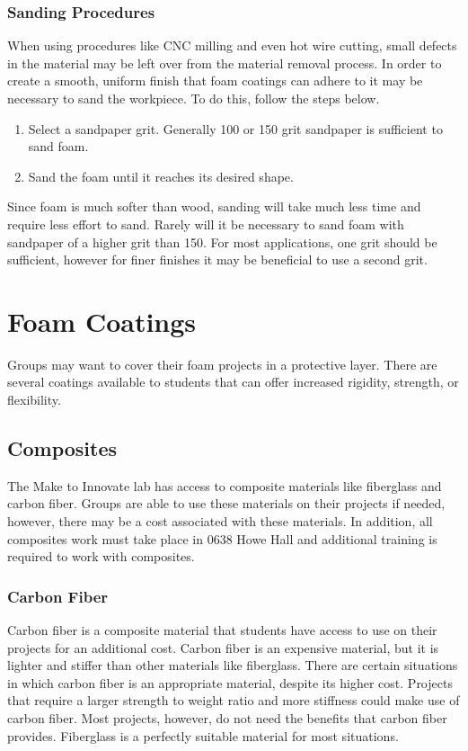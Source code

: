 \subsection{Sanding Procedures}
When using procedures like CNC milling and even hot wire cutting, small defects in the material may be left over from the material removal process. In order to create a smooth, uniform finish that foam coatings can adhere to it may be necessary to sand the workpiece.  To do this, follow the steps below.

\begin{enumerate}
\item Select a sandpaper grit.  Generally 100 or 150 grit sandpaper is sufficient to sand foam.
\item Sand the foam until it reaches its desired shape.
\end{enumerate}

Since foam is much softer than wood, sanding will take much less time and require less effort to sand.  Rarely will it be necessary to sand foam with sandpaper of a higher grit than 150.  For most applications, one grit should be sufficient, however for finer finishes it may be beneficial to use a second grit.

\chapter{Foam Coatings}
Groups may want to cover their foam projects in a protective layer. There are several coatings available to students that can offer increased rigidity, strength, or flexibility.
\section{Composites}
The Make to Innovate lab has access to composite materials like fiberglass and carbon fiber. Groups are able to use these materials on their projects if needed, however, there may be a cost associated with these materials.  In addition, all composites work must take place in 0638 Howe Hall and additional training is required to work with composites.

\subsection{Carbon Fiber}
Carbon fiber is a composite material that students have access to use on their projects for an additional cost. Carbon fiber is an expensive material, but it is lighter and stiffer than other materials like fiberglass. There are certain situations in which carbon fiber is an appropriate material, despite its higher cost. Projects that require a larger strength to weight ratio and more stiffness could make use of carbon fiber. Most projects, however, do not need the benefits that carbon fiber provides. Fiberglass is a perfectly suitable material for most situations.

